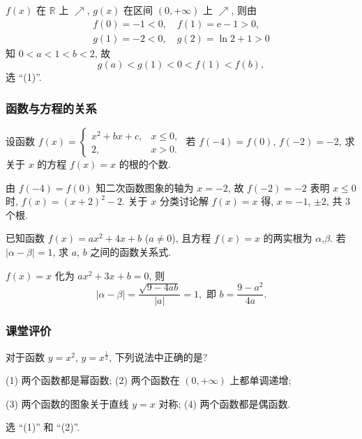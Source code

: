   \beginsolution
    $f(x)$ 在 $\mathbb{R}$ 上 $\nearrow$, $g(x)$ 在区间 $(0,+\infty)$ 上 $\nearrow$, 则由
    \begin{gather*}
      f(0)=-1<0,\quad f(1)=\mathrm{e}-1>0,\\
      g(1)=-2<0,\quad g(2)=\ln2+1>0
    \end{gather*}
    知 $0<a<1<b<2$, 故
    \[g(a)<g(1)<0<f(1)<f(b),\]
    选 ``(1)''.
  \endsolution
  
  \subsubsection{函数与方程的关系}
  \begin{example}
    设函数 $f(x)=\begin{cases}
      x^2+bx+c, & x\leqslant 0,\\
      2, & x>0.\end{cases}$ 若 $f(-4)=f(0)$, $f(-2)=-2$, 
    求关于 $x$ 的方程 $f(x)=x$ 的根的个数.
  \end{example}

  \beginsolution
    由 $f(-4)=f(0)$ 知二次函数图象的轴为 $x=-2$, 故 $f(-2)=-2$ 表明 $x\leqslant 0$ 时, $f(x)=(x+2)^2-2$. 关于 $x$ 分类讨论解 $f(x)=x$ 得, $x=-1$, $\pm2$, 共 $3$ 个根.
  \endsolution
  
  \lianxi
  \begin{exercise}[s]
    已知函数 $f(x)=ax^2 +4x+b$ ($a\neq0$), 且方程 $f(x)=x$ 的两实根为 $\alpha$,$\beta$. 若 $|\alpha-\beta|=1$, 求 $a$, $b$ 之间的函数关系式.
  \end{exercise}

  \beginsolution
    $f(x)=x$ 化为 $ax^2+3x+b=0$, 则 
    \[|\alpha-\beta|= \frac{\sqrt{9-4ab}}{|a|}=1, \text{\ 即 }
      b=\frac{9-a^2}{4a}.\]
  \endsolution
  
  \subsubsection{课堂评价}
  \begin{exercise}
    对于函数 $y=x^2$, $y=x^{\frac12}$, 下列说法中正确的是?
    
    (1) 两个函数都是幂函数;\qquad
    (2) 两个函数在 $(0,+\infty)$ 上都单调递增;
    
    (3) 两个函数的图象关于直线 $y=x$ 对称;\qquad
    (4) 两个函数都是偶函数.
  \end{exercise}

  \beginsolution
    选 ``(1)'' 和 ``(2)''.
  \endsolution
  
